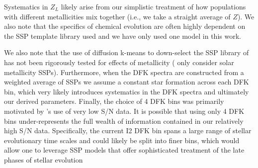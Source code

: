Systematics in $Z_L$ likely arise from our simplistic treatment of how
populations with different metallicities mix together (i.e., we take a
straight average of $Z$). We also note that the specifics of chemical
evolution are often highly dependent on the SSP template library used
and we have only used one model  in this work.


We also note that the use of diffusion k-means to down-select the SSP
library of \citet{Bruzual03} has not been rigorously tested for
effects of metallicity ( only consider solar
metallicity SSPs). Furthermore, when the DFK spectra are constructed
from a weighted average of SSPs we assume a constant star formation
across each DFK bin, which very likely introduces systematics in the
DFK spectra and ultimately our derived parameters. Finally, the choice
of 4 DFK bins was primarily motivated by 's use of
very low S/N data. It is possible that using only 4 DFK bins
under-represents the full wealth of information contained in our
relatively high S/N data. Specifically, the current I2 DFK bin spans a
large range of stellar evolutionary time scales and could likely be
split into finer bins, which would allow one to leverage SSP models
that offer sophisticated treatment of the late phases of stellar
evolution 



